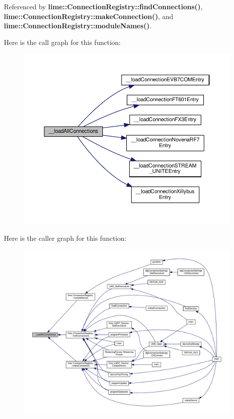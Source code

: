 Referenced by {\bf lime\+::\+Connection\+Registry\+::find\+Connections()}, {\bf lime\+::\+Connection\+Registry\+::make\+Connection()}, and {\bf lime\+::\+Connection\+Registry\+::module\+Names()}.



Here is the call graph for this function\+:
\nopagebreak
\begin{figure}[H]
\begin{center}
\leavevmode
\includegraphics[width=350pt]{d3/d58/ConnectionRegistry_8cpp_aa70d3b52e1cb50a0736b9cf791464ee1_cgraph}
\end{center}
\end{figure}




Here is the caller graph for this function\+:
\nopagebreak
\begin{figure}[H]
\begin{center}
\leavevmode
\includegraphics[width=350pt]{d3/d58/ConnectionRegistry_8cpp_aa70d3b52e1cb50a0736b9cf791464ee1_icgraph}
\end{center}
\end{figure}


